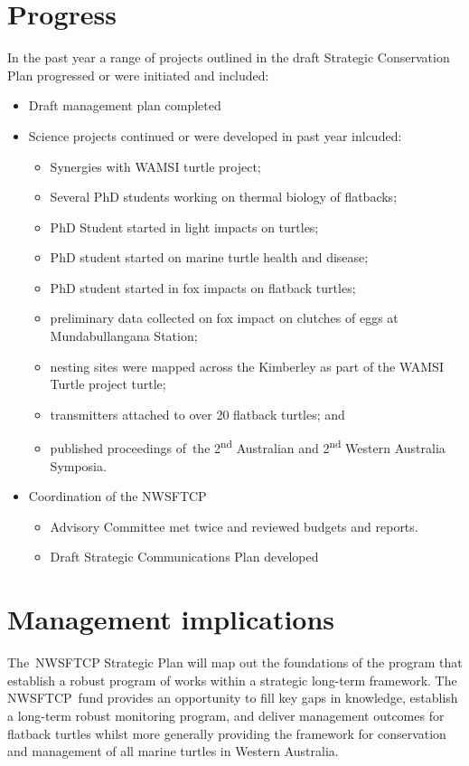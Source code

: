 \documentclass[version=last,
    paper=a4, %
    10pt, %
    usenames,
    dvipsnames,
    oneside, %
    headings=openany, %
    DIV=15 %
]{scrbook}
\begin{document}
\section*{Progress}
In the past year a range of projects outlined in the draft Strategic
Conservation Plan progressed or were initiated and included:

\begin{itemize}
\itemsep1pt\parskip0pt
\item
  Draft management plan completed
\item
  Science projects continued or were developed in past year inlcuded:

  \begin{itemize}
  \itemsep1pt\parskip0pt
  \item
    Synergies with WAMSI turtle project;
  \item
    Several PhD students working on thermal biology of flatbacks;
  \item
    PhD Student started in light impacts on turtles;
  \item
    PhD student started on marine turtle health and disease;
  \item
    PhD student started in fox impacts on flatback turtles;
  \item
    preliminary data collected on fox impact on clutches of eggs at
    Mundabullangana Station;
  \item
    nesting sites were mapped across the Kimberley as part of the WAMSI
    Turtle project turtle;
  \item
    transmitters attached to over 20 flatback turtles; and
  \item
    published proceedings of~the 2\textsuperscript{nd} Australian and
    2\textsuperscript{nd} Western Australia Symposia.
  \end{itemize}
\item
  Coordination of the NWSFTCP

  \begin{itemize}
  \itemsep1pt\parskip0pt
  \item
    Advisory Committee met twice and reviewed budgets and reports.
  \item
    Draft Strategic Communications Plan developed
  \end{itemize}
\end{itemize}



\section*{Management implications}
The~NWSFTCP Strategic Plan will map out the foundations of the program
that establish a robust program of works within a strategic long-term
framework. The NWSFTCP~fund provides an opportunity to fill key gaps in
knowledge, establish a long-term robust monitoring program, and deliver
management outcomes for flatback turtles whilst more generally providing
the framework for conservation and management of all marine turtles in
Western Australia.
\end{document}
